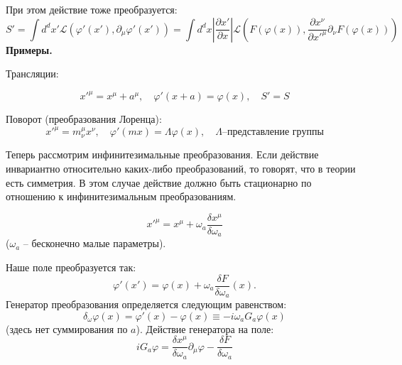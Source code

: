 \documentclass[a4paper,12pt]{article}
\theoremstyle{definition}
\theoremstyle{definition}
\theoremstyle{definition}
\begin{document}
При этом действие тоже преобразуется:
\begin{equation}
  \label{eq:305}
  S'=\int d^{d}x' \mathcal{L}(\varphi'(x'),\partial_{\mu} \varphi'(x'))=\int d^{d}x \left|\frac{\partial x'}{\partial x}\right| \mathcal{L}(F(\varphi(x)),\frac{\partial x^{\nu}}{\partial x'^{\mu}} \partial_{\nu}F(\varphi(x)))
\end{equation}
{\bf Примеры.}

Трансляции:

\begin{equation*}
  \label{eq:306}
  x'^{\mu}=x^{\mu}+a^{\mu},\quad \varphi'(x+a)=\varphi(x),\quad S'=S
\end{equation*}

Поворот (преобразования Лоренца):
\begin{equation*}
  x'^{\mu}=m^{\mu}_{\nu} x^{\nu}, \quad \varphi'(m x)=\Lambda \varphi(x),\quad \Lambda \mbox{--представление группы} 
\end{equation*}

Теперь рассмотрим инфинитезимальные преобразования.
Если действие инвариантно относительно каких-либо преобразований, то говорят, что в теории есть симметрия. В этом случае действие должно быть стационарно по отношению к инфинитезимальным преобразованиям.

\begin{equation}
  \label{eq:165}
  x'^{\mu}=x^{\mu}+\omega_a \frac{\delta x^{\mu}}{\delta \omega_a}
\end{equation}
($\omega_{a}$ -- бесконечно малые параметры).

Наше поле преобразуется так:
\begin{equation}
  \label{eq:166}
  \varphi'(x')=\varphi(x)+\omega_a \frac{\delta F}{\delta \omega_a} (x).
\end{equation}
Генератор преобразования определяется следующим равенством:
\begin{equation}
  \label{eq:167}
  \delta_{\omega} \varphi(x)=\varphi'(x)-\varphi(x)\equiv -i\omega_a G_a \varphi(x)
\end{equation}
(здесь нет суммирования по $a$). Действие генератора на поле:
\begin{equation}
  \label{eq:168}
  iG_a \varphi=\frac{\delta x^{\mu}}{\delta\omega_a} \partial_{\mu}\varphi-\frac{\delta F}{\delta \omega_a}
\end{equation}
\end{document}
